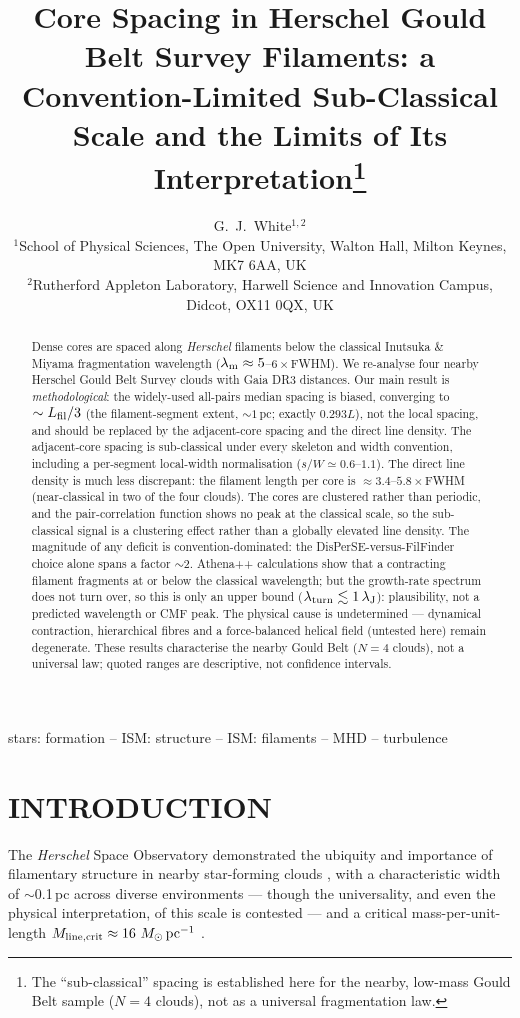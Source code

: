 \documentclass[usenatbib,twoside,twocolumn]{mnras}
\title[Sub-classical core spacing in HGBS filaments]{Core Spacing in Herschel Gould Belt Survey Filaments: a Convention-Limited Sub-Classical Scale and the Limits of Its Interpretation\thanks{The ``sub-classical'' spacing is established here for the nearby, low-mass Gould Belt sample ($N=4$ clouds), not as a universal fragmentation law.}}
\author[G.~J.~White]{G.~J.~White$^{1,2}$\\
$^{1}$School of Physical Sciences, The Open University, Walton Hall, Milton Keynes, MK7 6AA, UK\\
$^{2}$Rutherford Appleton Laboratory, Harwell Science and Innovation Campus, Didcot, OX11 0QX, UK}
\begin{document}
\maketitle

\begin{abstract}
Dense cores are spaced along \textit{Herschel} filaments below the classical Inutsuka \& Miyama fragmentation wavelength ($\lambda_{\rm m}\approx5$--$6\times$FWHM). We re-analyse four nearby Herschel Gould Belt Survey clouds with Gaia DR3 distances. Our main result is \emph{methodological}: the widely-used all-pairs median spacing is biased, converging to $\sim L_{\rm fil}/3$ (the filament-segment extent, $\sim1$\,pc; exactly $0.293L$), not the local spacing, and should be replaced by the adjacent-core spacing and the direct line density. The adjacent-core spacing is sub-classical under every skeleton and width convention, including a per-segment local-width normalisation ($s/W\simeq0.6$--$1.1$). The direct line density is much less discrepant: the filament length per core is $\approx3.4$--$5.8\times$FWHM (near-classical in two of the four clouds). The cores are clustered rather than periodic, and the pair-correlation function shows no peak at the classical scale, so the sub-classical signal is a clustering effect rather than a globally elevated line density. The magnitude of any deficit is convention-dominated: the DisPerSE-versus-FilFinder choice alone spans a factor $\sim$2. Athena++ calculations show that a contracting filament fragments at or below the classical wavelength; but the growth-rate spectrum does not turn over, so this is only an upper bound ($\lambda_{\rm turn}\lesssim1\,\lambda_{\rm J}$): plausibility, not a predicted wavelength or CMF peak. The physical cause is undetermined --- dynamical contraction, hierarchical fibres and a force-balanced helical field (untested here) remain degenerate. These results characterise the nearby Gould Belt ($N=4$ clouds), not a universal law; quoted ranges are descriptive, not confidence intervals.
\end{abstract}


\begin{keywords}
stars: formation -- ISM: structure -- ISM: filaments -- MHD -- turbulence
\end{keywords}

\section{INTRODUCTION}

The \textit{Herschel} Space Observatory demonstrated the ubiquity and importance of filamentary structure in nearby star-forming clouds \citep{Andre2010}, with a characteristic width of $\sim$0.1\,pc across diverse environments \citep{Arzoumanian2011} --- though the universality, and even the physical interpretation, of this scale is contested \citep{Panopoulou2017,Panopoulou2022} --- and a critical mass-per-unit-length $M_{\rm line,crit}\approx16~M_\odot\,{\rm pc^{-1}}$ \citep{Ostriker1964}.
\end{document}
